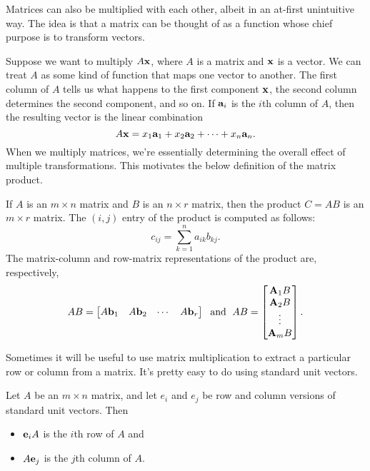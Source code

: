 \documentclass[../m073main.tex]{subfiles}
\begin{document}
Matrices can also be multiplied with each other, albeit in an at-first unintuitive way.
The idea is that a matrix can be thought of as a function whose chief purpose is to transform vectors.

Suppose we want to multiply $A \mathbf{x}$, where $A$ is a matrix and $\mathbf{x}$ is a vector.
We can treat $A$ as some kind of function that maps one vector to another.
The first column of $A$ tells us what happens to the first component $\mathbf{x}$, the second column determines the second component, and so on.
If $\mathbf{a}_i$ is the $i$th column of $A$, then the resulting vector is the linear combination
\[ A \mathbf{x} = x_1 \mathbf{a}_1 + x_2 \mathbf{a}_2 + \cdots + x_n \mathbf{a}_n. \]
When we multiply matrices, we're essentially determining the overall effect of multiple transformations.
This motivates the below definition of the matrix product.

\begin{definition}
	If $A$ is an $m\times n$ matrix and $B$ is an $n\times r$ matrix, then the product $C = AB$ is an $m\times r$ matrix.
	The $(i,j)$ entry of the product is computed as follows:
	\[ c_{ij} = \sum_{k=1}^n a_{ik} b_{kj}. \]
	The matrix-column and row-matrix representations of the product are, respectively,
	\[ AB = \begin{bmatrix} A \mathbf{b}_1 & A \mathbf{b}_2 & \cdots & A \mathbf{b}_r \end{bmatrix} \;\text{ and }\; AB = \begin{bmatrix} \mathbf{A}_1 B \\ \mathbf{A}_2 B\\ \vdots \\ \mathbf{A}_m B \end{bmatrix}. \]
\end{definition}

Sometimes it will be useful to use matrix multiplication to extract a particular row or column from a matrix.
It's pretty easy to do using standard unit vectors.

\begin{theorem}
	Let $A$ be an $m\times n$ matrix, and let $e_i$ and $e_j$ be row and column versions of standard unit vectors.
	Then
	\begin{itemize}
		\item $\mathbf{e}_iA$ is the $i$th row of $A$ and
		\item $A\mathbf{e}_j$ is the $j$th column of $A$.
	\end{itemize}
\end{theorem}
\end{document}
